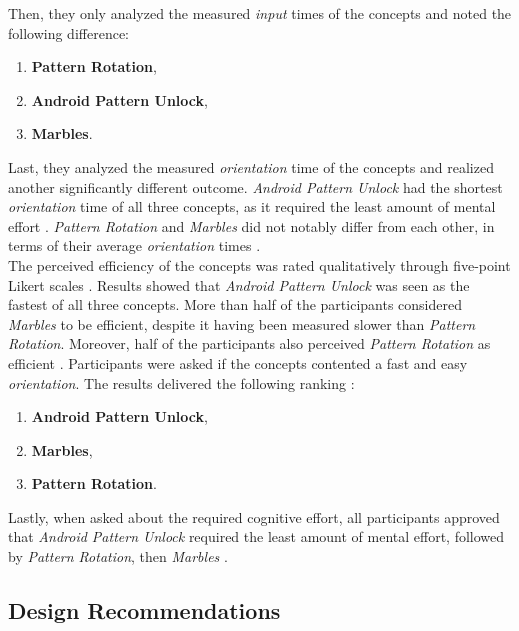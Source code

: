 Then, they only analyzed the measured \textit{input} times of the concepts and  noted the following difference:

\begin{enumerate}
    \item \textbf{Pattern Rotation},
    \item \textbf{Android Pattern Unlock},
    \item \textbf{Marbles}.
\end{enumerate}

Last, they analyzed the measured \textit{orientation} time of the concepts and realized another significantly different outcome. \textit{Android Pattern Unlock} had the shortest \textit{orientation} time of all three concepts, as it required the least amount of mental effort   \cite{Zezschwitz}. \textit{Pattern Rotation} and \textit{Marbles} did not notably differ from each other, in terms of their average \textit{orientation} times \cite{Zezschwitz}. \\


The perceived efficiency of the concepts was rated qualitatively through five-point Likert scales \cite{Zezschwitz}. Results showed that \textit{Android Pattern Unlock} was seen as the fastest of all three concepts. More than half of the participants considered \textit{Marbles} to be efficient, despite it having been measured slower than \textit{Pattern Rotation}. Moreover, half of the participants also perceived \textit{Pattern Rotation} as efficient \cite{Zezschwitz}. Participants were asked if the concepts contented a fast and easy \textit{orientation}. The results delivered the following ranking \cite{Zezschwitz}: 

\begin{enumerate}
     \item \textbf{Android Pattern Unlock},
    \item \textbf{Marbles},
    \item \textbf{Pattern Rotation}.
\end{enumerate}

Lastly, when asked about the required cognitive effort, all participants approved that \textit{Android Pattern Unlock} required the least amount of mental effort, followed by \textit{Pattern Rotation}, then \textit{Marbles} \cite{Zezschwitz}.

\subsection{Design Recommendations} \label{3.2.2}

